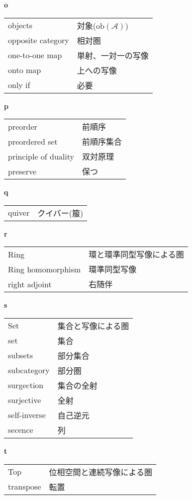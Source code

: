 \documentclass[dvipdfmx]{jsarticle}
\begin{document}
\textbf{o}

  \begin{tabular}{ll}
    objects & 対象($\mathrm{ob}(\mathscr{A})$) \\
    opposite category & 相対圏 \\
    one-to-one map & 単射、一対一の写像 \\
    onto map & 上への写像 \\
    only if & 必要 \\
  \end{tabular}

\textbf{p}

  \begin{tabular}{ll}
    preorder & 前順序 \\
    preordered set & 前順序集合 \\
    principle of duality & 双対原理 \\
    preserve & 保つ \\
  \end{tabular}

\textbf{q}

  \begin{tabular}{ll}
    quiver & クイバー(箙)
  \end{tabular}

\textbf{r}

  \begin{tabular}{ll}
    Ring & 環と環準同型写像による圏 \\
    Ring homomorphism & 環準同型写像 \\
    right adjoint & 右随伴 \\
  \end{tabular}

\textbf{s}

  \begin{tabular}{ll}
    Set & 集合と写像による圏 \\
    set & 集合 \\
    subsets & 部分集合 \\
    subcategory & 部分圏 \\
    surgection & 集合の全射 \\
    surjective & 全射 \\
    self-inverse & 自己逆元 \\
    secence & 列 \\
  \end{tabular}

\textbf{t}

  \begin{tabular}{ll}
    Top & 位相空間と連続写像による圏 \\
    transpose & 転置 \\
  \end{tabular}
\end{document}
